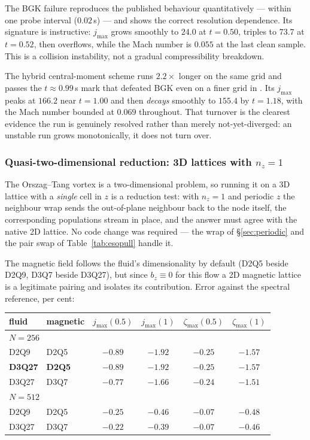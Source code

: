 \documentclass[11pt,a4paper]{article}
\begin{document}
The BGK failure reproduces the published behaviour quantitatively --- within one
probe interval ($0.02$\,s) --- and shows the correct resolution dependence. Its
signature is instructive: $j_{\max}$ grows smoothly to $24.0$ at $t=0.50$, triples
to $73.7$ at $t=0.52$, then overflows, while the Mach number is $0.055$ at the
last clean sample. This is a collision instability, not a gradual compressibility
breakdown.

The hybrid central-moment scheme runs $2.2\times$ longer on the same grid and
passes the $t\approx0.99$\,s mark that defeated BGK even on a finer grid in
\cite{derosis2018}. Its $j_{\max}$ peaks at $166.2$ near $t=1.00$ and then
\emph{decays} smoothly to $155.4$ by $t=1.18$, with the Mach number bounded at
$0.069$ throughout. That turnover is the clearest evidence the run is genuinely
resolved rather than merely not-yet-diverged: an unstable run grows
monotonically, it does not turn over.

\subsubsection{Quasi-two-dimensional reduction: 3D lattices with $n_z=1$}
\label{sec:reduction}

The Orszag--Tang vortex is a two-dimensional problem, so running it on a 3D
lattice with a \emph{single} cell in $z$ is a reduction test: with $n_z=1$ and
periodic $z$ the neighbour wrap sends the out-of-plane neighbour back to the node
itself, the corresponding populations stream in place, and the answer must agree
with the native 2D lattice. No code change was required --- the wrap of
\S\ref{sec:periodic} and the pair swap of Table~\ref{tab:esopull} handle it.

The magnetic field follows the fluid's dimensionality by default (D2Q5 beside
D2Q9, D3Q7 beside D3Q27), but since $b_z\equiv0$ for this flow a 2D
magnetic lattice is a legitimate pairing and isolates its contribution.
Error against the spectral reference, per cent:

\begin{center}\small
\begin{tabular}{llcccc}
\toprule
fluid & magnetic & $j_{\max}(0.5)$ & $j_{\max}(1)$ & $\zeta_{\max}(0.5)$ & $\zeta_{\max}(1)$ \\
\midrule
\multicolumn{6}{l}{\emph{$N=256$}}\\
D2Q9  & D2Q5 & $-0.89$ & $-1.92$ & $-0.25$ & $-1.57$ \\
\textbf{D3Q27} & \textbf{D2Q5} & $\bm{-0.89}$ & $\bm{-1.92}$ & $\bm{-0.25}$ & $\bm{-1.57}$ \\
D3Q27 & D3Q7 & $-0.77$ & $-1.66$ & $-0.24$ & $-1.51$ \\
\midrule
\multicolumn{6}{l}{\emph{$N=512$}}\\
D2Q9  & D2Q5 & $-0.25$ & $-0.46$ & $-0.07$ & $-0.48$ \\
D3Q27 & D3Q7 & $-0.22$ & $-0.39$ & $-0.07$ & $-0.46$ \\
\bottomrule
\end{tabular}
\end{center}
\end{document}
